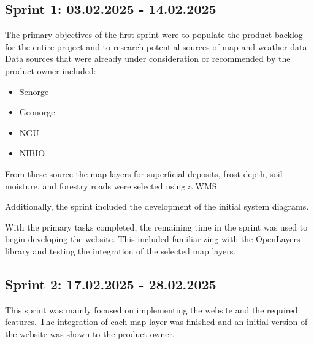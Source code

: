 \subsection{Sprint 1: 03.02.2025 - 14.02.2025}

The primary objectives of the first sprint were to populate the product backlog for the entire project and to research potential sources of map and weather data. Data sources that were already under consideration or recommended by the product owner included:
\begin{itemize} 
    \item Senorge
    \item Geonorge
    \item NGU
    \item NIBIO
\end{itemize}

From these source the map layers for superficial deposits, frost depth, soil moisture, and forestry roads were selected using a WMS.

Additionally, the sprint included the development of the initial system diagrams. 

With the primary tasks completed, the remaining time in the sprint was used to begin developing the website. This included familiarizing with the OpenLayers library and testing the integration of the selected map layers.

\subsection{Sprint 2: 17.02.2025 - 28.02.2025}

This sprint was mainly focused on implementing the website and the required features. The integration of each map layer was finished and an initial version of the website was shown to the product owner.  

